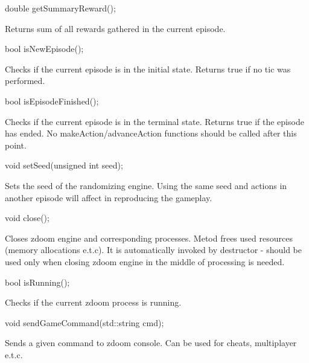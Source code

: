 \vspace{20pt}
\begin{clinee}
	double getSummaryReward();
\end{clinee}

Returns sum of all rewards gathered in the current episode.


\vspace{20pt}
\begin{clinee}
	bool isNewEpisode();
\end{clinee}

Checks if the current episode is in the initial state. Returns true if no tic was performed.


\vspace{20pt}
\begin{clinee}
	bool isEpisodeFinished();
\end{clinee}

Checks if the current episode is in the terminal state. Returns true if the episode has ended. No makeAction/advanceAction functions should be called after this point.


\vspace{20pt}
\begin{clinee}
	void setSeed(unsigned int seed);
\end{clinee}

Sets the seed of the randomizing engine. Using the same seed and actions in another episode will affect in reproducing the gameplay.


\vspace{20pt}
\begin{clinee}
	void close();
\end{clinee}

Closes zdoom engine and corresponding processes. Metod frees used resources (memory allocations e.t.c). It is automatically invoked by destructor - should be used only when closing zdoom engine in the middle of processing is needed.


\vspace{20pt}
\begin{clinee}
	bool isRunning();
\end{clinee}

Checks if the current zdoom process is running.


\vspace{20pt}
\begin{clinee}
	void sendGameCommand(std::string cmd);
\end{clinee}

Sends a given command to zdoom console. Can be used for cheats, multiplayer e.t.c.


